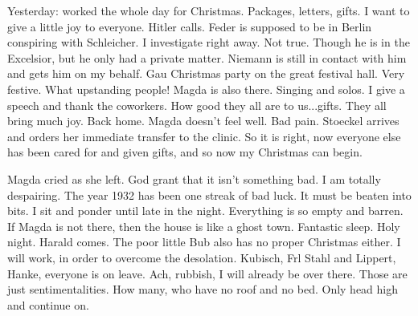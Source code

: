 Yesterday: worked the whole day for Christmas. Packages, letters, gifts. I want to give a little joy to everyone. Hitler calls. Feder is supposed to be in Berlin conspiring with Schleicher. I investigate right away. Not true. Though he is in the Excelsior, but he only had a private matter. Niemann is still in contact with him and gets him on my behalf. Gau Christmas party on the great festival hall. Very festive. What upstanding people! Magda is also there. Singing and solos. I give a speech and thank the coworkers. How good they all are to us...gifts. They all bring much joy. Back home. Magda doesn't feel well. Bad pain. Stoeckel arrives and orders her immediate transfer to the clinic. So it is right, now everyone else has been cared for and given gifts, and so now my Christmas can begin.

Magda cried as she left. God grant that it isn't something bad. I am totally despairing. The year 1932 has been one streak of bad luck. It must be beaten into bits. I sit and ponder until late in the night. Everything is so empty and barren. If Magda is not there, then the house is like a ghost town. Fantastic sleep. Holy night. Harald comes. The poor little Bub also has no proper Christmas either. I will work, in order to overcome the desolation. Kubisch, Frl Stahl and Lippert, Hanke, everyone is on leave. Ach, rubbish, I will already be over there. Those are just sentimentalities. How many, who have no roof and no bed. Only head high and continue on.